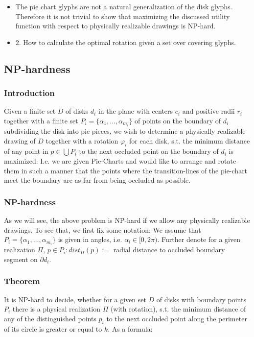 \documentclass[a4paper,11pt]{article}
\begin{document}
\begin{itemize}
  \item The pie chart glyphs are not a natural generalization of the disk glyphs. Therefore it is not trivial to show that maximizing the discussed utility function with respect to physically realizable drawings is NP-hard.
  \item 2. How to calculate the optimal rotation given a set over covering glyphs.
\end{itemize}

\newpage

\subsection{NP-hardness}
\subsubsection{Introduction}
Given a finite set $D$ of disks $d_i$ in the plane with centers $c_i$ and positive radii $r_i$ together with a finite set $P_i = \{ \alpha_1, \dots, \alpha_{m_i}\}$ of points on the boundary of $d_i$ subdividing the disk into pie-pieces, we wish to determine a physically realizable drawing of $D$ together with a rotation $\varphi_i$ for each disk, s.t. the minimum distance of any point in $p\in\bigcup P_i$ to the next occluded point on the boundary of $d_i$ is maximized.
I.e. we are given Pie-Charts and would like to arrange and rotate them in such a manner that the points where the transition-lines of the pie-chart meet the boundary are as far from being occluded as possible.

\subsubsection{NP-hardness}
As we will see, the above problem is NP-hard if we allow any physically realizable drawings. To see that, we first fix some notation:
We assume that $P_i = \{ \alpha_1, \dots, \alpha_{m_i}\}$ is given in angles, i.e. $\alpha_l\in [0, 2\pi)$. Further denote for a given realization $\Pi$, $p\in P_i: dist_\Pi(p) := $ radial distance to occluded boundary segment on $\partial d_i$.

\subsubsection{Theorem}
It is NP-hard to decide, whether for a given set $D$ of disks with boundary points $P_i$ there is a physical realization $\Pi$ (with rotation), s.t. the minimum distance of any of the distinguished points $p_i$ to the next occluded point along the perimeter of its circle is greater or equal to $k$. As a formula:
\end{document}
